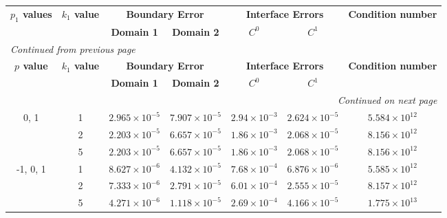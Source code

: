 \begin{table}[htbp]
    \centering
    \begin{longtable}{ccccccc}
        \toprule
        \multicolumn{1}{c}{\textbf{\(p_1\) values}} & \multicolumn{1}{c}{\textbf{\(k_1\) value}} & \multicolumn{2}{c}{\textbf{Boundary Error}} & \multicolumn{2}{c}{\textbf{Interface Errors}} & \multicolumn{1}{c}{\textbf{Condition number}} \\
        \cmidrule(lr){2-2} \cmidrule(lr){3-4} \cmidrule(lr){5-6} \cmidrule(lr){7-7}
        & & \textbf{Domain 1} & \textbf{Domain 2} & \textbf{\(C^0\)} & \textbf{\(C^1\)} & \\
        \midrule
        \endfirsthead %
        \multicolumn{7}{l}{{\footnotesize\emph{Continued from previous page}}} \\
        \toprule
        \multicolumn{1}{c}{\textbf{\(p\) value}} & \multicolumn{1}{c}{\textbf{\(k_1\) value}} & \multicolumn{2}{c}{\textbf{Boundary Error}} & \multicolumn{2}{c}{\textbf{Interface Errors}} & \multicolumn{1}{c}{\textbf{Condition number}} \\
        \cmidrule(lr){2-2} \cmidrule(lr){3-4} \cmidrule(lr){5-6} \cmidrule(lr){7-7}
        & & \textbf{Domain 1} & \textbf{Domain 2} & \textbf{\(C^0\)} & \textbf{\(C^1\)} & \\
        \midrule
        \endhead %
        \midrule[\heavyrulewidth] %
        \multicolumn{7}{r}{{\footnotesize\emph{Continued on next page}}} \\
        \endfoot %
        \bottomrule
        \endlastfoot %
        
        0, 1 & 1 & $2.965\times10^{-5}$ & $7.907\times10^{-5}$ & $2.94\times10^{-3}$ & $2.624\times10^{-5}$ & $5.584\times10^{12}$ \\
        & 2 & $2.203\times10^{-5}$ & $6.657\times10^{-5}$ & $1.86\times10^{-3}$ & $2.068\times10^{-5}$ & $8.156\times10^{12}$ \\
        & 5 & $2.203\times10^{-5}$ & $6.657\times10^{-5}$ & $1.86\times10^{-3}$ & $2.068\times10^{-5}$ & $8.156\times10^{12}$ \\
        \midrule[\heavyrulewidth] %
        
        -1, 0, 1 & 1 & $8.627\times10^{-6}$ & $4.132\times10^{-5}$ & $7.68\times10^{-4}$ & $6.876\times10^{-6}$ & $5.585\times10^{12}$ \\
        & 2 & $7.333\times10^{-6}$ & $2.791\times10^{-5}$ & $6.01\times10^{-4}$ & $2.555\times10^{-5}$ & $8.157\times10^{12}$ \\
        & 5 & $4.271\times10^{-6}$ & $1.118\times10^{-5}$ & $2.69\times10^{-4}$ & $4.166\times10^{-5}$ & $1.775\times10^{13}$ \\
        \midrule[\heavyrulewidth] %


\end{longtable}
\end{table}
